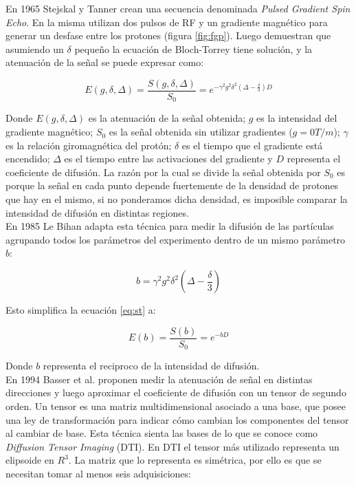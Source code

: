En 1965 Stejskal y Tanner \cite{Stejskal1965} crean una secuencia
denominada \textit{Pulsed Gradient Spin Echo}. En la misma utilizan dos
pulsos de RF y un gradiente magn\'etico para generar un desfase entre los
protones (figura \ref{fig:fgp}). Luego demuestran que asumiendo un $\delta$
peque\~no la ecuaci\'on de Bloch-Torrey tiene soluci\'on, y la atenuaci\'on
de la se\~nal se puede expresar como:

\begin{equation}
    E(g, \delta, \Delta) = 
    \frac{S(g, \delta, \Delta)}{S_0} =
         e^{-\gamma^2 g^2 \delta^2 \left(\Delta - \frac{\delta}{3}\right) D} 
    \label{eq:st}
\end{equation}
  
Donde $E(g, \delta, \Delta)$ es la atenuaci\'on de la se\~nal obtenida; 
$g$ es la intensidad del gradiente magn\'etico; $S_0$ es la se\~nal
obtenida sin utilizar gradientes ($g=0 T/m$); $\gamma$ es la relaci\'on
giromagn\'etica del  prot\'on; $\delta$ es el tiempo que el gradiente 
est\'a encendido; $\Delta$ es el tiempo entre las activaciones del
gradiente y $D$ representa el coeficiente de difusi\'on. La raz\'on por la
cual se divide la se\~nal obtenida por $S_0$ es porque la se\~nal en cada
punto depende fuertemente de la densidad de protones que hay en el mismo,
si no ponderamos dicha densidad, es imposible comparar la intensidad de
difusi\'on en distintas regiones. \\

En 1985 Le Bihan \cite{LEBIHAN} adapta esta t\'ecnica para medir la 
difusi\'on de las part\'iculas agrupando todos los par\'ametros del
experimento dentro de un mismo par\'ametro $b$:

$$ b = \gamma^2 g^2 \delta^2 \left(\Delta - \frac{\delta}{3}\right) $$ 

Esto simplifica la ecuaci\'on \ref{eq:st} a:  

$$ E(b) = \frac{S(b)}{S_0} = e^{-b D} $$

Donde $b$ representa el reciproco de la intensidad de difusi\'on. \\

En 1994 Basser et al. \cite{Basser1994} proponen medir la atenuaci\'on de
se\~nal en distintas direcciones y luego aproximar el coeficiente de 
difusi\'on con un tensor de segundo orden. Un tensor es una matriz
multidimensional asociado a una base, que posee una ley de 
transformaci\'on  para indicar  c\'omo cambian los componentes del tensor
al cambiar de base. Esta t\'ecnica sienta las bases de lo que se conoce
como \textit{Diffusion Tensor Imaging} (DTI). En DTI el tensor m\'as
utilizado representa un elipsoide en $R^3$. La matriz que lo representa
es sim\'etrica, por ello es que se necesitan tomar al menos seis
adquisiciones: 

